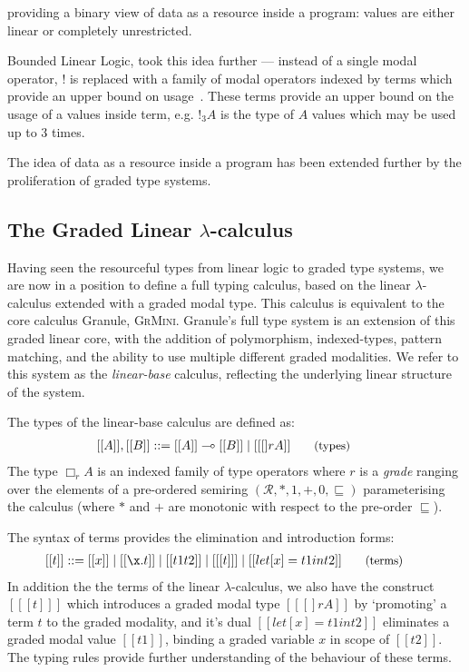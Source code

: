 providing a binary view of data as a
resource inside a program: values are either linear or completely unrestricted.

Bounded Linear Logic, took this idea further --- instead of a single modal
operator, $!$ is replaced with a family of modal operators indexed by terms
which provide an upper bound on usage~\cite{}. These terms provide an upper bound on
the usage of a values inside term, e.g. $!_{3}A$ is the type of $A$ values which
may be used up to 3 times.


The idea of data as a resource inside a program has been extended further by the
proliferation of graded type systems.


\subsection{The Graded Linear $\lambda$-calculus}
\label{sec:linear-base}

Having seen the resourceful types from linear logic to graded type systems, we
are now in a position to define a full typing calculus, based on the linear
$\lambda$-calculus extended with a graded modal type. This calculus is
equivalent to the core calculus Granule,
\textsc{GrMini}\cite{}. Granule's full type system is an extension of this
graded linear core, with the addition of polymorphism, indexed-types, pattern
matching, and the ability to use multiple different graded modalities. We refer
to this system as the \textit{linear-base} calculus, reflecting the underlying
linear structure of the system.

The types of the linear-base calculus are defined as:
\begin{align*}
\hspace{-0.9em}[[ A ]] , [[ B ]] & ::=
       [[ A ]] \multimap [[ B ]]
  \mid [[ [] r A ]]
{\small{\tag{types}}}
\end{align*}
The type $\Box_{r} A$ is an indexed family of type operators where $r$ is a
\textit{grade} ranging over the elements of a pre-ordered semiring
$({\mathcal{R}}, {*}, {1}, {+}, {0},
{\sqsubseteq})$ parameterising the calculus (where $\ast$ and $+$
are monotonic with respect to the pre-order $\sqsubseteq$).

The syntax of terms provides the elimination and introduction forms:
\begin{align*}
\hspace{-0.8em} [[ t ]] ::= \;
       & [[ x ]]
  \mid [[ \x . t ]]
  \mid [[ t1 t2 ]]
  \mid [[ [t] ]]
  \mid [[ let [ x ] = t1 in t2 ]]
{\small{\tag{terms}}}
\end{align*}
In addition the the terms of the linear $\lambda$-calculus, we also have the
construct $[[ [t] ]]$ which introduces a graded modal type $[[ [] r A
]]$ by `promoting' a term $t$ to the graded modality, and it's dual $[[ let [x] = t1
in t2 ]]$ eliminates a graded modal value $[[ t1 ]]$, binding a graded variable $x$
in scope of $[[ t2 ]]$. The typing rules provide further understanding of the
behaviour of these terms.

